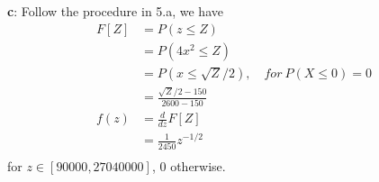 \documentclass[12pt,letterpaper]{article}
\begin{document}
    \textbf{c}: Follow the procedure in 5.a, we have
        \begin{equation*}
            \begin{aligned}
                F[Z] &= P(z \leq Z) \\
                &= P(4x^{2} \leq Z) \\
                &= P(x \leq \sqrt{Z} / 2),\quad for\ P(X \leq 0) = 0 \\
                &= \frac{\sqrt{Z} / 2 - 150}{2600 - 150} \\
                f(z) &= \frac{d}{dz}F[Z] \\
                &= \frac{1}{2450} z^{-1/2} \\
            \end{aligned}
        \end{equation*}
    for $z \in [90000, 27040000]$, 0 otherwise.
\end{document}

